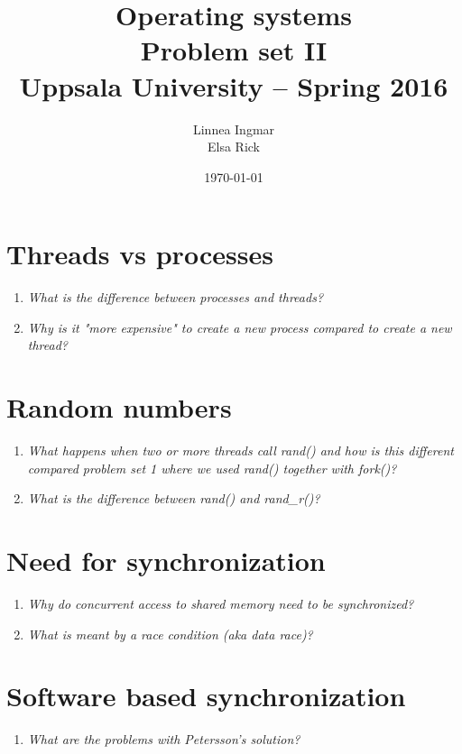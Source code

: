 \documentclass[a4paper]{article}
\title{\textbf{Operating systems \\
    Problem set II \\
    Uppsala University -- Spring 2016 \\}}
\author{Linnea Ingmar \\
  Elsa Rick}
\date{\today}
\begin{document}
\maketitle

\section{Threads vs processes}
\begin{enumerate}
  \item \textit{What is the difference between processes and threads?} \\
  \item \textit{ Why is it "more expensive" to create a new process compared to create a new thread?} \\
\end{enumerate}

\section{Random numbers}
 \begin{enumerate}
    \item \textit{What happens when two or more threads call rand() and how is this different compared problem set 1 where we used rand() together with fork()?} \\
    \item \textit{What is the difference between rand() and rand\_r()?}\\
 \end{enumerate}

\section{Need for synchronization}
\begin{enumerate}
  \item \textit{ Why do concurrent access to shared memory need to be synchronized? }\\
  \item  \textit{What is meant by a race condition (aka data race)? }\\
\end{enumerate}

\section{Software based synchronization}
\begin{enumerate}
  \item  \textit{What are the problems with Petersson's solution? }\\
\end{enumerate}
\end{document}
